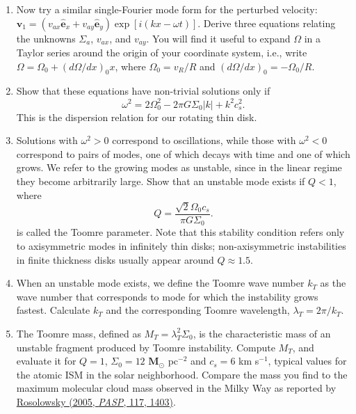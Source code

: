 \documentclass[twoside]{tufte-book} %
\newcommand{\vecv}{\mathbf{v}}
\newcommand{\msun}{\ensuremath{\textbf{M}_\odot}}
\newcommand{\ehat}{\hat{\mathbf{e}}}
\begin{document}
\begin{enumerate}
\begin{enumerate}
\item Now try a similar single-Fourier mode form for the perturbed velocity: $\vecv_1 = (v_{ax} \ehat_x + v_{ay} \ehat_y) \exp[i(kx - \omega t)]$. Derive three equations relating the unknowns $\Sigma_a$, $v_{ax}$, and $v_{ay}$. You will find it useful to expand $\Omega$ in a Taylor series around the origin of your coordinate system, i.e., write $\Omega = \Omega_0 + (d\Omega/dx)_0 x$, where $\Omega_0 = v_R/R$ and $(d\Omega/dx)_{0} = -\Omega_0/R$.
\item Show that these equations have non-trivial solutions only if
\begin{displaymath}
\omega^2 = 2 \Omega_0^2 - 2 \pi G \Sigma_0 |k| + k^2 c_s^2.
\end{displaymath}
This is the dispersion relation for our rotating thin disk.
\item Solutions with $\omega^2 > 0$ correspond to oscillations, while those with $\omega^2 < 0$ correspond to pairs of modes, one of which decays with time and one of which grows. We refer to the growing modes as unstable, since in the linear regime they become arbitrarily large. Show that an unstable mode exists if $Q<1$, where
\begin{displaymath}
Q = \frac{\sqrt{2} \Omega_0 c_s}{\pi G \Sigma_0}.
\end{displaymath}
is called the Toomre parameter. Note that this stability condition refers only to axisymmetric modes in infinitely thin disks; non-axisymmetric instabilities in finite thickness disks usually appear around $Q\approx 1.5$.
\item When an unstable mode exists, we define the Toomre wave number $k_T$ as the wave number that corresponds to mode for which the instability grows fastest. Calculate $k_T$ and the corresponding Toomre wavelength, $\lambda_T = 2\pi / k_T$.
\item The Toomre mass, defined as $M_T =  \lambda_T^2 \Sigma_0$, is the characteristic mass of an unstable fragment produced by Toomre instability. Compute $M_T$, and evaluate it for $Q=1$, $\Sigma_0=12$ $\msun$ pc$^{-2}$ and $c_s = 6$ km s$^{-1}$, typical values for the atomic ISM in the solar neighborhood. Compare the mass you find to the maximum molecular cloud mass observed in the Milky Way as reported by \href{http://adsabs.harvard.edu/abs/2005PASP..117.1403R}{Rosolowsky (2005, {\it PASP}, 117, 1403)}. \nocite{rosolowsky05b}\\
\end{enumerate}




\end{enumerate}
\end{document}
